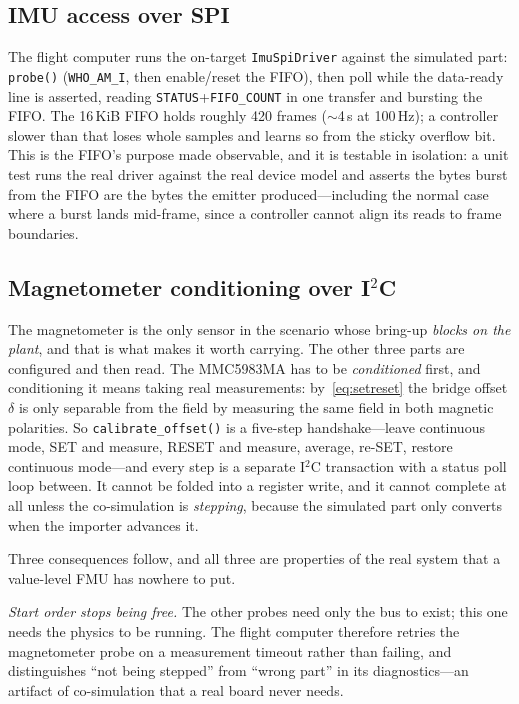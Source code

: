 \documentclass[preprint,12pt,a4paper]{elsarticle}
\newcommand{\code}[1]{\texttt{\small #1}}
\begin{document}
\subsection{IMU access over SPI}
The flight computer runs the on-target \code{ImuSpiDriver} against the simulated
part: \code{probe()} (\code{WHO\_AM\_I}, then enable/reset the FIFO), then poll
while the data-ready line is asserted, reading \code{STATUS}+\code{FIFO\_COUNT}
in one transfer and bursting the FIFO. The 16\,KiB FIFO holds roughly 420 frames
($\sim$4\,s at 100\,Hz); a controller slower than that loses whole samples and
learns so from the sticky overflow bit. This is the FIFO's purpose made
observable, and it is testable in isolation: a unit test runs the real driver
against the real device model and asserts the bytes burst from the FIFO are the
bytes the emitter produced---including the normal case where a burst lands
mid-frame, since a controller cannot align its reads to frame boundaries.

\subsection{Magnetometer conditioning over I\texorpdfstring{$^2$}{2}C}
\label{sec:magcond}
The magnetometer is the only sensor in the scenario whose bring-up
\emph{blocks on the plant}, and that is what makes it worth carrying. The other
three parts are configured and then read. The MMC5983MA has to be
\emph{conditioned} first, and conditioning it means taking real measurements:
by~\eqref{eq:setreset} the bridge offset $\delta$ is only separable from the
field by measuring the same field in both magnetic polarities. So
\code{calibrate\_offset()} is a five-step handshake---leave continuous mode,
SET and measure, RESET and measure, average, re-SET, restore continuous
mode---and every step is a separate I$^2$C transaction with a status poll loop
between. It cannot be folded into a register write, and it cannot complete at
all unless the co-simulation is \emph{stepping}, because the simulated part only
converts when the importer advances it.

Three consequences follow, and all three are properties of the real system that
a value-level FMU has nowhere to put.

\emph{Start order stops being free.} The other probes need only the bus to
exist; this one needs the physics to be running. The flight computer therefore
retries the magnetometer probe on a measurement timeout rather than failing, and
distinguishes ``not being stepped'' from ``wrong part'' in its diagnostics---an
artifact of co-simulation that a real board never needs.
\end{document}
